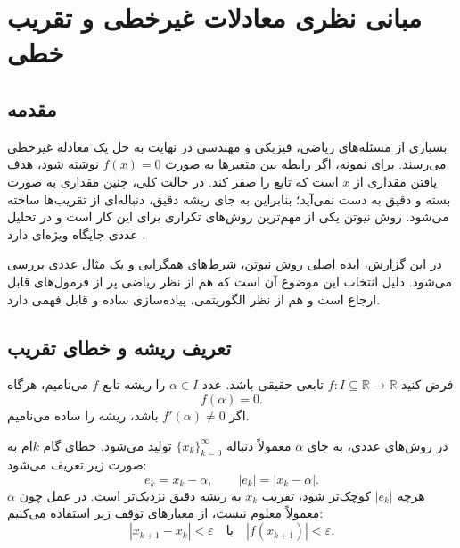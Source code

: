 \chapter{مبانی نظری معادلات غیرخطی و تقریب خطی}

\section{مقدمه}
بسیاری از مسئله‌های ریاضی، فیزیکی و مهندسی در نهایت به حل یک معادله غیرخطی می‌رسند. برای نمونه، اگر رابطه بین متغیرها به صورت $f(x)=0$ نوشته شود، هدف یافتن مقداری از $x$ است که تابع را صفر کند. در حالت کلی، چنین مقداری به صورت بسته و دقیق به دست نمی‌آید؛ بنابراین به جای ریشه دقیق، دنباله‌ای از تقریب‌ها ساخته می‌شود. روش نیوتن یکی از مهم‌ترین روش‌های تکراری برای این کار است و در تحلیل عددی جایگاه ویژه‌ای دارد \cite{burden,atkinson}.

در این گزارش، ایده اصلی روش نیوتن، شرط‌های همگرایی و یک مثال عددی بررسی می‌شود. دلیل انتخاب این موضوع آن است که هم از نظر ریاضی پر از فرمول‌های قابل ارجاع است و هم از نظر الگوریتمی، پیاده‌سازی ساده و قابل فهمی دارد.

\section{تعریف ریشه و خطای تقریب}
\begin{definition}
فرض کنید $f:I\subseteq \mathbb{R}\to \mathbb{R}$ تابعی حقیقی باشد. عدد $\alpha\in I$ را ریشه تابع $f$ می‌نامیم، هرگاه
\begin{equation}
 f(\alpha)=0.
 \label{eq:root-definition}
\end{equation}
اگر $f'(\alpha)\neq 0$ باشد، ریشه را ساده می‌نامیم.
\end{definition}

در روش‌های عددی، به جای $\alpha$ معمولاً دنباله $\{x_k\}_{k=0}^{\infty}$ تولید می‌شود. خطای گام $k$ام به صورت زیر تعریف می‌شود:
\begin{equation}
 e_k=x_k-\alpha, \qquad |e_k|=|x_k-\alpha|.
 \label{eq:error-definition}
\end{equation}
هرچه $|e_k|$ کوچک‌تر شود، تقریب $x_k$ به ریشه دقیق نزدیک‌تر است. در عمل چون $\alpha$ معمولاً معلوم نیست، از معیارهای توقف زیر استفاده می‌کنیم:
\begin{equation}
 |x_{k+1}-x_k|<\varepsilon
 \quad \text{یا} \quad
 |f(x_{k+1})|<\varepsilon.
 \label{eq:stopping}
\end{equation}

